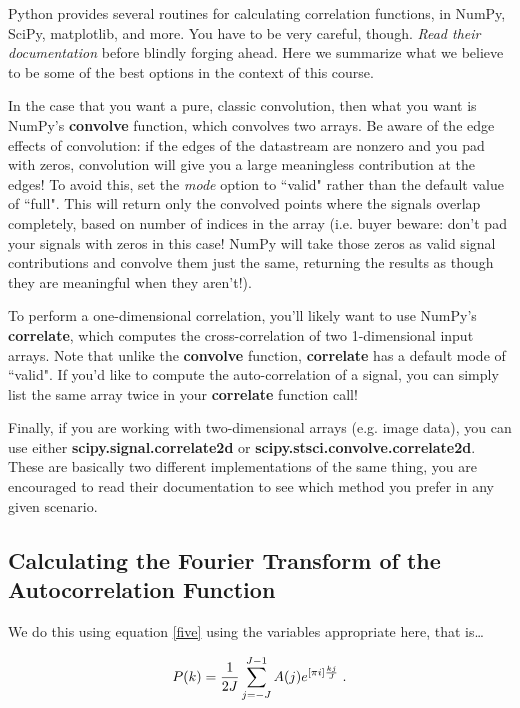 \documentclass[preprint]{aastex}
\begin{document}
 Python provides several routines for calculating correlation
functions, in NumPy, SciPy, matplotlib, and more. You have to be very careful, 
though.  {\it Read their documentation} before blindly forging ahead. Here we 
summarize what we believe to be some of the best options in the context of this 
course.

In the case that you want a pure, classic convolution, then what you want is 
NumPy's {\bf convolve} function, which convolves two arrays. Be aware of the 
edge effects of convolution: if the edges of the datastream are nonzero and 
you pad with zeros,
convolution will give you a large meaningless contribution at the edges!
To avoid this, set the {\it mode} option to ``valid" rather than the default 
value of ``full". This will return only the convolved points where the signals 
overlap completely, based on number of indices in the array (i.e. buyer beware: 
don't pad your signals with zeros in this case! NumPy will take those zeros as 
valid signal contributions and convolve them just the same, returning the 
results as though they are meaningful when they aren't!).

To perform a one-dimensional correlation, you'll likely want to use NumPy's 
{\bf correlate}, which computes the cross-correlation of two 1-dimensional 
input arrays. Note that unlike the {\bf convolve} function, {\bf correlate} has 
a default mode of ``valid". If you'd like to compute the auto-correlation of a 
signal, you can simply list the same array twice in your {\bf correlate} 
function call!

Finally, if you are working with two-dimensional arrays (e.g. image data), you 
can use either {\bf scipy.signal.correlate2d} or {\bf 
scipy.stsci.convolve.correlate2d}. These are basically two different 
implementations of the same thing, you are encouraged to read their 
documentation to see which method you prefer in any given scenario.

\subsection{Calculating the Fourier Transform of the Autocorrelation
Function}

	We do this using equation \ref{five} using the variables
appropriate here, that is\dots

\begin{equation}
P(k) = {1 \over 2J} \sum_{j=-J}^{J-1} A(j) e^{[\pi i] {kj \over J}} \; .
\end{equation}
\end{document}
